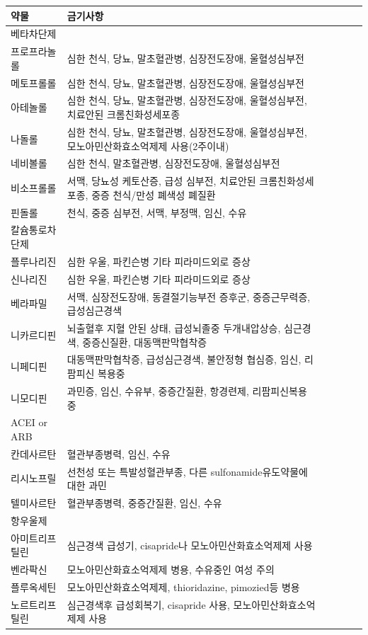 \documentclass[]{book}
\begin{document}
\begin{longtable}{llllll}
\toprule
약물 & 금기사항\\
\midrule
베타차단제 & \\
프로프라놀롤 & 심한 천식, 당뇨, 말초혈관병, 심장전도장애, 울혈성심부전\\
메토프롤롤 & 심한 천식, 당뇨, 말초혈관병, 심장전도장애, 울혈성심부전\\
아테놀롤 & 심한 천식, 당뇨, 말초혈관병, 심장전도장애, 울혈성심부전, 치료안된 크롬친화성세포종\\
나돌롤 & 심한 천식, 당뇨, 말초혈관병, 심장전도장애, 울혈성심부전, 모노아민산화효소억제제 사용(2주이내)\\
\addlinespace
네비볼롤 & 심한 천식, 말초혈관병, 심장전도장애, 울혈성심부전\\
비소프롤롤 & 서맥, 당뇨성 케토산증, 급성 심부전, 치료안된  크롬친화성세포종, 중증 천식/만성 폐색성 폐질환\\
핀돌롤 & 천식, 중증 심부전, 서맥, 부정맥, 임신, 수유\\
칼슘통로차단제 & \\
플루나리진 & 심한 우울, 파킨슨병 기타 피라미드외로 증상\\
\addlinespace
신나리진 & 심한 우울, 파킨슨병 기타 피라미드외로 증상\\
베라파밀 & 서맥, 심장전도장애, 동결절기능부전 증후군, 중증근무력증, 급성심근경색\\
니카르디핀 & 뇌출혈후 지혈 안된 상태, 급성뇌졸중 두개내압상승, 심근경색, 중증신질환, 대동맥판막협착증\\
니페디핀 & 대동맥판막협착증, 급성심근경색, 불안정형 협심증, 임신, 리팜피신 복용중\\
니모디핀 & 과민증, 임신, 수유부, 중증간질환, 항경련제, 리팜피신복용 중\\
\addlinespace
ACEI or ARB & \\
칸데사르탄 & 혈관부종병력, 임신, 수유\\
리시노프릴 & 선천성 또는 특발성혈관부종, 다른 sulfonamide유도약물에 대한 과민\\
텔미사르탄 & 혈관부종병력, 중증간질환, 임신, 수유\\
항우울제 & \\
\addlinespace
아미트리프틸린 & 심근경색 급성기, cisapride나 모노아민산화효소억제제 사용\\
벤라팍신 & 모노아민산화효소억제제 병용, 수유중인 여성 주의\\
플루옥세틴 & 모노아민산화효소억제제, thioridazine, pimozied등 병용\\
노르트리프틸린 & 심근경색후 급성회복기, cisapride 사용, 모노아민산화효소억제제 사용\\

\end{longtable}
\end{document}
